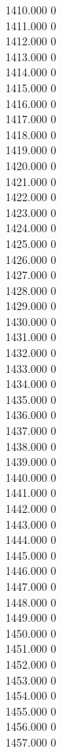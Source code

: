 { 1410.000	0 \\
 1411.000	0 \\
 1412.000	0 \\
 1413.000	0 \\
 1414.000	0 \\
 1415.000	0 \\
 1416.000	0 \\
 1417.000	0 \\
 1418.000	0 \\
 1419.000	0 \\
 1420.000	0 \\
 1421.000	0 \\
 1422.000	0 \\
 1423.000	0 \\
 1424.000	0 \\
 1425.000	0 \\
 1426.000	0 \\
 1427.000	0 \\
 1428.000	0 \\
 1429.000	0 \\
 1430.000	0 \\
 1431.000	0 \\
 1432.000	0 \\
 1433.000	0 \\
 1434.000	0 \\
 1435.000	0 \\
 1436.000	0 \\
 1437.000	0 \\
 1438.000	0 \\
 1439.000	0 \\
 1440.000	0 \\
 1441.000	0 \\
 1442.000	0 \\
 1443.000	0 \\
 1444.000	0 \\
 1445.000	0 \\
 1446.000	0 \\
 1447.000	0 \\
 1448.000	0 \\
 1449.000	0 \\
 1450.000	0 \\
 1451.000	0 \\
 1452.000	0 \\
 1453.000	0 \\
 1454.000	0 \\
 1455.000	0 \\
 1456.000	0 \\
 1457.000	0 \\
}
